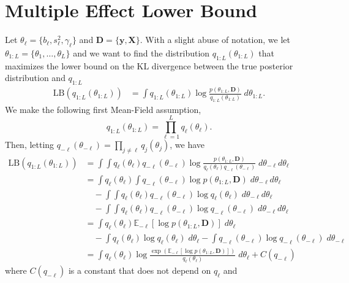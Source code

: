 \documentclass{article}
\newcommand{\E}{\mathbb{E}}
\begin{document}
\section{Multiple Effect Lower Bound}

Let $\theta_\ell = \{b_\ell, s_\ell^2, \gamma_\ell\}$ and $\mathbf{D} = \{\mathbf{y}, \mathbf{X}\}$. With a slight abuse of notation, we let $\theta_{1:L} = \{\theta_1, \ldots, \theta_L\}$ and we want to find the distribution $q_{1:L}(\theta_{1:L})$ that maximizes the lower bound on the KL divergence between the true posterior distribution and $q_{1:L}$
\begin{align*}
    \text{LB}(q_{1:L}(\theta_{1:L})) &= \int q_{1:L}(\theta_{1:L}) \log \frac{p(\theta_{1:L}, \mathbf{D})}{q_{1:L}(\theta_{1:L})} \;d\theta_{1:L}.
\end{align*}
We make the following first Mean-Field assumption,
\begin{equation}
    q_{1:L}(\theta_{1:L}) = \prod_{\ell=1}^L q_\ell(\theta_\ell).
\end{equation}
Then, letting $q_{-\ell}(\theta_{-\ell}) = \prod_{j\neq\ell} q_j(\theta_j)$, we have
\begin{align*}
    \text{LB}(q_{1:L}(\theta_{1:L})) &= \int\int q_\ell(\theta_\ell) q_{-\ell}(\theta_{-\ell}) \log \frac{p(\theta_{1:L}, \mathbf{D})}{q_\ell(\theta_\ell) q_{-\ell}(\theta_{-\ell})} \;d\theta_{-\ell} d\theta_{\ell} \\
    &= \int q_\ell(\theta_\ell) \int q_{-\ell}(\theta_{-\ell}) \log p(\theta_{1:L}, \mathbf{D}) \;d\theta_{-\ell}d\theta_{\ell} \\
    &\quad - \int \int q_\ell(\theta_\ell) q_{-\ell}(\theta_{-\ell})\log q_\ell(\theta_\ell)\;d\theta_{-\ell}d\theta_{\ell} \\
    &\quad - \int \int q_\ell(\theta_\ell) q_{-\ell}(\theta_{-\ell})\log q_{-\ell}(\theta_{-\ell}) \;d\theta_{-\ell}d\theta_{\ell}  \\
    &= \int q_\ell(\theta_\ell) \E_{-\ell}\left[\log p(\theta_{1:L}, \mathbf{D})\right]\;d\theta_{\ell} \\
    &\quad - \int q_\ell(\theta_\ell) \log q_\ell(\theta_\ell)\;d\theta_{\ell} - \int q_{-\ell}(\theta_{-\ell})\log q_{-\ell}(\theta_{-\ell}) \;d\theta_{-\ell} \\ 
    &= \int q_\ell(\theta_\ell) \log \frac{\exp\left(\E_{-\ell}\left[\log p(\theta_{1:L}, \mathbf{D})\right]\right)}{q_\ell(\theta_\ell)}\;d\theta_{\ell} + C(q_{-\ell})
\end{align*}
where $C(q_{-\ell})$ is a constant that does not depend on $q_\ell$ and
\end{document}
